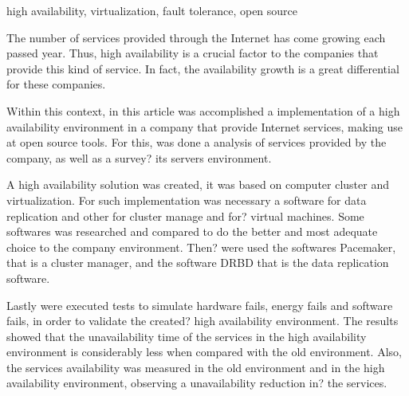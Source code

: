 \begin{englishabstract}{}{high availability, virtualization, fault tolerance, open source}

The number of services provided through the Internet has come growing each passed year. Thus, high availability is a crucial factor to the 
companies that provide this kind of service. In fact, the availability growth is a great differential for these companies.

Within this context, in this article was accomplished a implementation of a high availability environment in a company that provide 
Internet services, making use at open source tools. For this, was done a analysis of services provided by the company, 
as well as a survey? its servers environment.

A high availability solution was created, it was based on computer cluster and virtualization.
For such implementation was necessary a software for data replication and other for cluster manage and for? virtual machines. 
Some softwares was researched and compared to do the better and most adequate choice to the company environment.
Then? were used the softwares Pacemaker, that is a cluster manager, and the software DRBD that is the data replication software.

Lastly were executed tests to simulate hardware fails, energy fails and software fails, in order to validate the created? high availability
environment. The results showed that the unavailability time of the services in the high availability environment is considerably less when 
compared with the old environment. Also, the services availability was measured in the old environment and in the high availability environment, 
observing a unavailability reduction in? the services.

\end{englishabstract}
